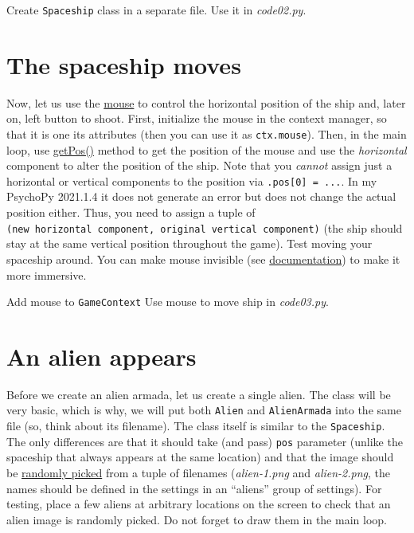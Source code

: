 \documentclass[
]{book}
\begin{document}
Create \texttt{Spaceship} class in a separate file.
Use it in \emph{code02.py}.

\hypertarget{the-spaceship-moves}{%
\section{The spaceship moves}\label{the-spaceship-moves}}

Now, let us use the \href{https://psychopy.org/api/event.html\#psychopy.event.Mouse}{mouse} to control the horizontal position of the ship and, later on, left button to shoot. First, initialize the mouse in the context manager, so that it is one its attributes (then you can use it as \texttt{ctx.mouse}). Then, in the main loop, use \href{https://psychopy.org/api/event.html\#psychopy.event.Mouse.getPos}{getPos()} method to get the position of the mouse and use the \emph{horizontal} component to alter the position of the ship. Note that you \emph{cannot} assign just a horizontal or vertical components to the position via \texttt{.pos{[}0{]}\ =\ ...}. In my PsychoPy 2021.1.4 it does not generate an error but does not change the actual position either. Thus, you need to assign a tuple of \texttt{(new\ horizontal\ component,\ original\ vertical\ component)} (the ship should stay at the same vertical position throughout the game). Test moving your spaceship around. You can make mouse invisible (see \href{https://psychopy.org/api/event.html\#psychopy.event.Mouse}{documentation}) to make it more immersive.

Add mouse to \texttt{GameContext}
Use mouse to move ship in \emph{code03.py}.

\hypertarget{an-alien-appears}{%
\section{An alien appears}\label{an-alien-appears}}

Before we create an alien armada, let us create a single alien. The class will be very basic, which is why, we will put both \texttt{Alien} and \texttt{AlienArmada} into the same file (so, think about its filename). The class itself is similar to the \texttt{Spaceship}. The only differences are that it should take (and pass) \texttt{pos} parameter (unlike the spaceship that always appears at the same location) and that the image should be \href{https://docs.python.org/3/library/random.html\#random.choice}{randomly picked} from a tuple of filenames (\emph{alien-1.png} and \emph{alien-2.png}, the names should be defined in the settings in an ``aliens'' group of settings). For testing, place a few aliens at arbitrary locations on the screen to check that an alien image is randomly picked. Do not forget to draw them in the main loop.
\end{document}
